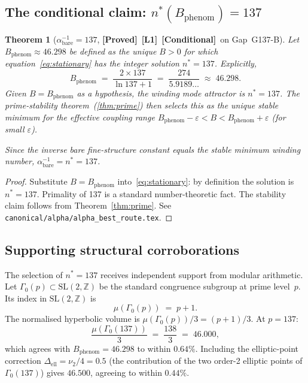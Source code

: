 \documentclass[12pt,a4paper]{article}
\newtheorem{theorem}{Theorem}[section]
\theoremstyle{definition}
\theoremstyle{remark}
\newcommand{\PROVED}{\textbf{[Proved]}}
\newcommand{\COND}{\textbf{[Conditional]}}
\newcommand{\Lone}{\textbf{[L1]}}
\newcommand{\ZZ}{\mathbb{Z}}
\begin{document}
\subsection{The conditional claim: $n^*(B_{\mathrm{phenom}}) = 137$}

\begin{theorem}[$\alpha^{-1}_{\mathrm{bare}} = 137$, \PROVED\ \Lone\ \COND\ on Gap~G137-B]
\label{thm:alpha137}
Let $B_{\mathrm{phenom}} \approx 46.298$ be defined as the unique $B > 0$ for
which equation~\eqref{eq:stationary} has the integer solution $n^* = 137$.
Explicitly,
\begin{equation}
\label{eq:bphenom}
  B_{\mathrm{phenom}}
  \;=\;
  \frac{2\times 137}{\ln 137 + 1}
  \;=\;
  \frac{274}{5.9189\ldots}
  \;\approx\;
  46.298.
\end{equation}
Given $B = B_{\mathrm{phenom}}$ as a hypothesis, the winding mode attractor
is $n^* = 137$.  The prime-stability theorem~(\ref{thm:prime}) then selects
this as the unique stable minimum for the effective coupling range
$B_{\mathrm{phenom}} - \varepsilon < B < B_{\mathrm{phenom}} + \varepsilon$
(for small $\varepsilon$).

Since the inverse bare fine-structure constant equals the stable minimum
winding number, $\alpha^{-1}_{\mathrm{bare}} = n^* = 137$.
\end{theorem}

\begin{proof}
Substitute $B = B_{\mathrm{phenom}}$ into~\eqref{eq:stationary}: by
definition the solution is $n^* = 137$.  Primality of 137 is a standard
number-theoretic fact.  The stability claim follows from
Theorem~\ref{thm:prime}.  See \texttt{canonical/alpha/alpha\_best\_route.tex}.
\end{proof}

\subsection{Supporting structural corroborations}

The selection of $n^* = 137$ receives independent support from modular
arithmetic.  Let $\Gamma_0(p) \subset \mathrm{SL}(2,\ZZ)$ be the standard
congruence subgroup at prime level~$p$.  Its index in $\mathrm{SL}(2,\ZZ)$
is
\[
  \mu(\Gamma_0(p)) \;=\; p + 1.
\]
The normalised hyperbolic volume is $\mu(\Gamma_0(p))/3 = (p+1)/3$.
At $p = 137$:
\[
  \frac{\mu(\Gamma_0(137))}{3} \;=\; \frac{138}{3} \;=\; 46.000,
\]
which agrees with $B_{\mathrm{phenom}} = 46.298$ to within $0.64\%$.
Including the elliptic-point correction
$\Delta_{\mathrm{ell}} = \nu_2/4 = 0.5$ (the contribution of the two
order-2 elliptic points of $\Gamma_0(137)$) gives $46.500$, agreeing to
within $0.44\%$.
\end{document}

